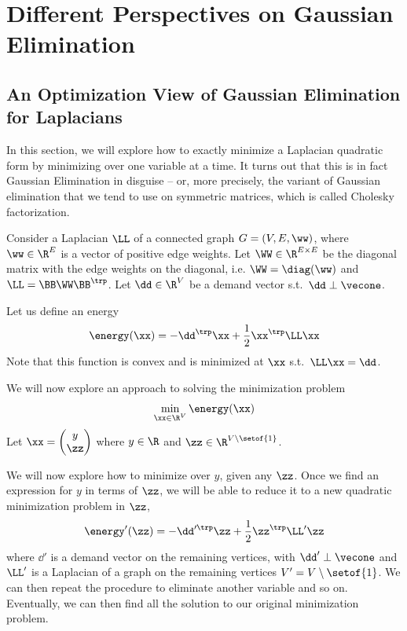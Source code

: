 \chapter{Different Perspectives on Gaussian
  Elimination}
\label{cha:ge}
%


%
\sloppy


\section{An Optimization View of Gaussian Elimination for Laplacians}
In this section, we will explore how to exactly minimize a Laplacian
quadratic form by minimizing over one variable at a time.
It turns out that this is in fact Gaussian Elimination in disguise --
or, more precisely, the variant of Gaussian elimination that we tend
to use on symmetric matrices, which is called Cholesky factorization.

Consider a Laplacian $\LL$ of a connected graph $G = (V,E,\ww)$, where
$\ww \in \R^E$ is a vector of positive edge weights.
Let $\WW \in \R^{E \times E}$ be the diagonal matrix with the edge
weights on the diagonal, i.e. $\WW = \diag(\ww)$ and
$\LL = \BB\WW\BB^\trp$.
Let $\dd \in \R^V$ be a demand vector s.t.\ $ \dd \perp \vecone$.

Let us define an energy
\[
  \energy(\xx) =
-\dd^\trp\xx +
  \frac{1}{2}\xx^\trp\LL\xx
\]
Note that this function is convex and is minimized at $\xx$ s.t.\ $\LL
\xx = \dd$.

We will now explore an approach to solving the minimization problem
\[
\min_{\xx \in \R^V } \energy(\xx)
  \]
%
Let $\xx =
\begin{pmatrix}
  y \\ \zz
\end{pmatrix}$ where $y \in \R$ and $\zz \in \R^{V \setminus
  \setof{1}}$.

We will now explore how to minimize over $y$, given any $\zz$.
Once we find an expression for $y$ in terms of $\zz$,
we will be able to reduce  it to a
new quadratic minimization problem in $\zz$,
\[
  \energy'(\zz) =
-\dd'^\trp\zz +
  \frac{1}{2}\zz^\trp\LL'\zz
\]
where $\dd'$ is a demand vector on the remaining vertices, with $\dd'
\perp \vecone$ and $\LL'$ is a Laplacian of a graph on the remaining
vertices $V' = V \setminus \setof{1}$.
We can then repeat the procedure to eliminate another variable and so on.
Eventually, we can then find all the solution to our original
minimization problem.

